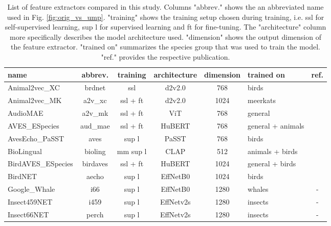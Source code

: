 
\begin{table*}[t]
  
  \caption{List of feature extractors compared in this study. Columns "abbrev." shows the an abbreviated name used in Fig. \ref{fig:orig_vs_ump}. "training" shows the training setup chosen during training, i.e. ssl for self-supervised learning, sup l for supervised learning and ft for fine-tuning. The "architecture" column more specifically describes the model architecture used. "dimension" shows the output dimension of the feature extractor. "trained on" summarizes the species group that was used to train the model. "ref." provides the respective publication.}
  \label{tab:bacpipe_models}
  \centering
  \begin{tabular}{|l|c|c|c|c|l|c|}
    \hline
    name& abbrev. & 
    training & architecture &
    dimension & trained on & ref.\\
    \hline
    Animal2vec\_XC      & brdnet   & ssl & d2v2.0 & 768 & birds & \cite{schafer-zimmermann_animal2vec_2024}\\
    Animal2vec\_MK      & a2v\_xc  & ssl + ft & d2v2.0 & 1024& meerkats & \cite{schafer-zimmermann_animal2vec_2024}\\
    AudioMAE            & a2v\_mk  & ssl + ft & ViT 	 & 768 & general & \cite{huang_masked_2022}\\
    AVES\_ESpecies      & aud\_mae   & ssl + ft & HuBERT 	 & 768 & general + animals & \cite{hagiwara_aves_2022}\\
    AvesEcho\_PaSST     & aves   & sup l & PaSST 	 & 768 & birds & \cite{ghani_generalization_2024}\\
    BioLingual          & bioling  & mm sup l & CLAP 	 & 512 & animals + birds & \cite{robinson_transferable_2023}\\
    BirdAVES\_ESpecies  & birdaves   & ssl + ft & HuBERT 	 & 1024& general + birds & \cite{hagiwara_aves_2022}\\
    BirdNET             & aecho   & sup l & EffNetB0 	 & 1024& birds & \cite{kahl_birdnet_2021}\\
    Google\_Whale       & i66   & sup l & EffNetB0 	 & 1280& whales & - \\
    Insect459NET        & i459 & sup l & EffNetv2s 	 & 1280& insects & - \\
    Insect66NET         & perch & sup l & EffNetv2s 	 & 1280& insects & - \\

\end{tabular}
\end{table*}
